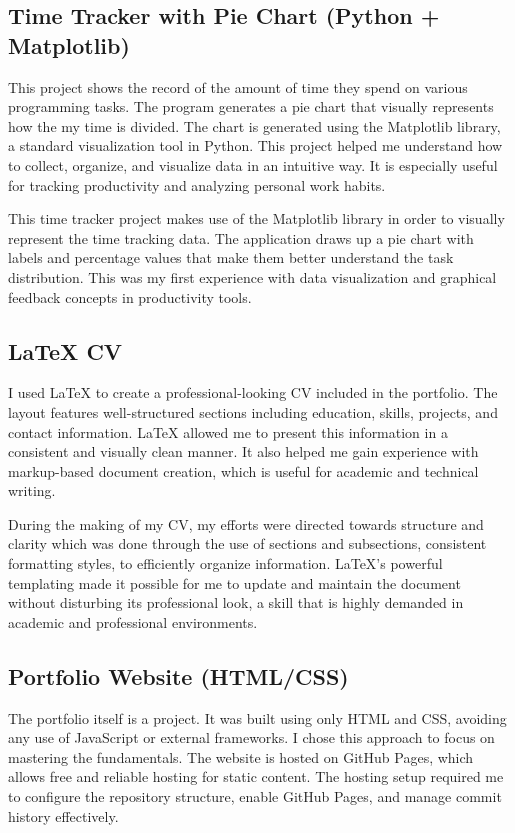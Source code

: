 \documentclass[12pt,a4paper]{article}
\begin{document}
\subsection{Time Tracker with Pie Chart (Python + Matplotlib)}
This project shows the record of the amount of time they spend on various programming tasks. The program generates a pie chart that visually represents how the my  time is divided.
The chart is generated using the Matplotlib library, a standard visualization tool in Python. This project helped me understand how to collect, organize, and visualize data in an intuitive way. It is especially useful for tracking productivity and analyzing personal work habits.

This time tracker project makes use of the Matplotlib library in order to visually represent the time tracking data. The application draws up a pie chart with labels and percentage values that make them better understand the task distribution. This was my first experience with data visualization and graphical feedback concepts in productivity tools.


\subsection{LaTeX CV}
I used LaTeX to create a professional-looking CV included in the portfolio. The layout features well-structured sections including education, skills, projects, and contact information. LaTeX allowed me to present this information in a consistent and visually clean manner. It also helped me gain experience with markup-based document creation, which is useful for academic and technical writing.

During the making of my CV, my efforts were directed towards structure and clarity which was done through the use of sections and subsections, consistent formatting styles, to efficiently organize information. LaTeX's powerful templating made it possible for me to update and maintain the document without disturbing its professional look, a skill that is highly demanded in academic and professional environments.


\subsection{Portfolio Website (HTML/CSS)}
The portfolio itself is a project. It was built using only HTML and CSS, avoiding any use of JavaScript or external frameworks. I chose this approach to focus on mastering the fundamentals.
The website is hosted on GitHub Pages, which allows free and reliable hosting for static content. The hosting setup required me to configure the repository structure, enable GitHub Pages, and manage commit history effectively.
\end{document}
